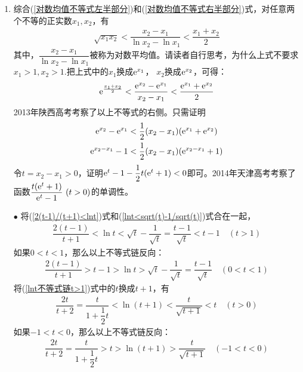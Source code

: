 \begin{enumerate}[label={【\textbf{例\thechapter.\arabic*}】},
 leftmargin=\inteval{\myenumleftmargin}pt,
 itemsep=\inteval{\myenumitempsep}pt,
 itemindent=\inteval{\myenumitemindent}pt]
\item 综合(\ref{对数均值不等式左半部分})和(\ref{对数均值不等式右半部分})式，对任意两个不等的正实数$ x_1,x_2 $，有
\begin{align} \label{对数割线斜率不等式}
	\sqrt{x_1x_2}<\dfrac{x_2-x_1}{\ln x_2-\ln x_1}<\dfrac{x_1+x_2}{2}
\end{align}
其中，$ \dfrac{x_2-x_1}{\ln x_2-\ln x_1} $被称为对数平均值。请读者自行思考，为什么上式不要求$ x_1>1,x_2>1 $.把上式中的$ x_1 $换成$ \mathrm{e}^{x_1} $，
$ x_2 $换成$ \mathrm{e}^{x_2} $，可得：
\begin{align*}
	\mathrm{e}^{\frac{x_1+x_2}{2}}<\dfrac{\mathrm{e}^{x_2}-\mathrm{e}^{x_1}}{x_2-x_1}<
	\dfrac{\mathrm{e}^{x_1}+\mathrm{e}^{x_2}}{2}
\end{align*}
2013年陕西高考考察了以上不等式的右侧。只需证明
\begin{gather*}
	\mathrm{e}^{x_2}-\mathrm{e}^{x_1}<\dfrac{1}{2}(x_2-x_1)(\mathrm{e}^{x_1}+\mathrm{e}^{x_2}) \\
	\mathrm{e}^{x_2-x_1}-1<\dfrac{1}{2}(x_2-x_1)(\mathrm{e}^{x_2-x_1}+1) 
\end{gather*}
令$ t=x_2-x_1>0 $，证明$ \mathrm{e}^t-1-\dfrac{1}{2}t(\mathrm{e}^t+1)<0 $即可。2014年天津高考考察了函数$ \dfrac{t(\e^t+1)}{\e^t-1}\ (t>0) $的单调性。

$ \bullet $ 将(\ref{2(t-1)/(t+1)<lnt})式和(\ref{lnt<sqrt(t)-1/sqrt(t)})式合在一起，
\begin{align}\label{lnt不等式链t>1}
	\dfrac{2(t-1)}{t+1}<\ln t<\sqrt{t}-\dfrac{1}{\sqrt{t}}=
	\dfrac{t-1}{\sqrt{t}}<t-1 \quad (t>1)
\end{align}
如果$ 0<t<1 $，那么以上不等式链反向：
\begin{align}\label{lnt不等式链0<t<1}
	\dfrac{2(t-1)}{t+1}>t-1>\ln t>\sqrt{t}-\dfrac{1}{\sqrt{t}}=
	\dfrac{t-1}{\sqrt{t}} \quad (0<t<1)
\end{align}
将(\ref{lnt不等式链t>1})式中的$ t $换成$ t+1 $，有
\begin{align}\label{ln(1+t)不等式链t>0}
	\dfrac{2t}{t+2}=\dfrac{t}{1+\dfrac{1}{2}t}<\ln(t+1)<\dfrac{t}{\sqrt{t+1}}<t \quad (t>0)
\end{align}
如果$ -1<t<0 $，那么以上不等式链反向：
\begin{align}\label{ln(1+t)不等式链-1<t<0}
	\dfrac{2t}{t+2}=\dfrac{t}{1+\dfrac{1}{2}t}>t>\ln(t+1)>\dfrac{t}{\sqrt{t+1}} \quad (-1<t<0 )
\end{align}


\end{enumerate}
